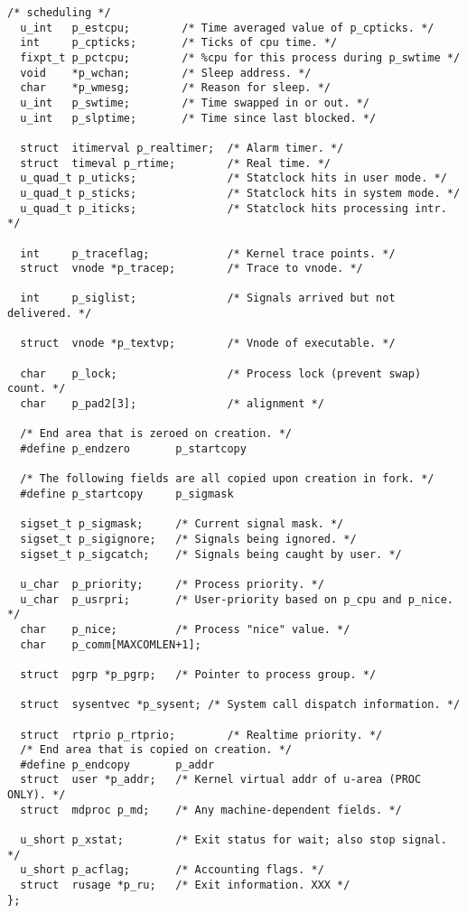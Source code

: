 \documentclass[10pt,letterpaper,onecolumn,draftclsnofoot]{IEEEtran}
\begin{document}
\begin{lstlisting}[caption=The FreeBSD proc structure is responsible for tracking the
state of processes.]
  /* scheduling */
  u_int   p_estcpu;        /* Time averaged value of p_cpticks. */
  int     p_cpticks;       /* Ticks of cpu time. */
  fixpt_t p_pctcpu;        /* %cpu for this process during p_swtime */
  void    *p_wchan;        /* Sleep address. */
  char    *p_wmesg;        /* Reason for sleep. */
  u_int   p_swtime;        /* Time swapped in or out. */
  u_int   p_slptime;       /* Time since last blocked. */

  struct  itimerval p_realtimer;  /* Alarm timer. */
  struct  timeval p_rtime;        /* Real time. */
  u_quad_t p_uticks;              /* Statclock hits in user mode. */
  u_quad_t p_sticks;              /* Statclock hits in system mode. */
  u_quad_t p_iticks;              /* Statclock hits processing intr. */

  int     p_traceflag;            /* Kernel trace points. */
  struct  vnode *p_tracep;        /* Trace to vnode. */

  int     p_siglist;              /* Signals arrived but not delivered. */

  struct  vnode *p_textvp;        /* Vnode of executable. */

  char    p_lock;                 /* Process lock (prevent swap) count. */
  char    p_pad2[3];              /* alignment */

  /* End area that is zeroed on creation. */
  #define p_endzero       p_startcopy

  /* The following fields are all copied upon creation in fork. */
  #define p_startcopy     p_sigmask

  sigset_t p_sigmask;     /* Current signal mask. */
  sigset_t p_sigignore;   /* Signals being ignored. */
  sigset_t p_sigcatch;    /* Signals being caught by user. */

  u_char  p_priority;     /* Process priority. */
  u_char  p_usrpri;       /* User-priority based on p_cpu and p_nice. */
  char    p_nice;         /* Process "nice" value. */
  char    p_comm[MAXCOMLEN+1];

  struct  pgrp *p_pgrp;   /* Pointer to process group. */

  struct  sysentvec *p_sysent; /* System call dispatch information. */

  struct  rtprio p_rtprio;        /* Realtime priority. */
  /* End area that is copied on creation. */
  #define p_endcopy       p_addr
  struct  user *p_addr;   /* Kernel virtual addr of u-area (PROC ONLY). */
  struct  mdproc p_md;    /* Any machine-dependent fields. */

  u_short p_xstat;        /* Exit status for wait; also stop signal. */
  u_short p_acflag;       /* Accounting flags. */
  struct  rusage *p_ru;   /* Exit information. XXX */
};
\end{lstlisting}
\end{document}
